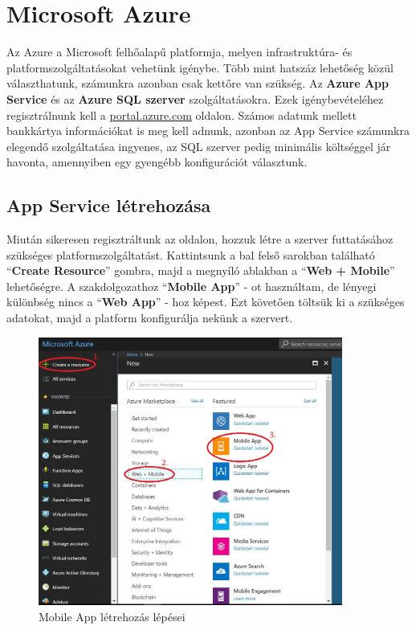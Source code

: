 \documentclass[a4paper,12pt]{report}
\begin{document}
    \section{Microsoft Azure}
    Az Azure a Microsoft felhőalapű platformja, melyen infrastruktúra- és platformszolgáltatásokat vehetünk igénybe. Több mint
    hatszáz lehetőség közül választhatunk, számunkra azonban csak kettőre van szükség. Az \textbf{Azure App Service} és az
    \textbf{Azure SQL szerver} szolgáltatásokra. Ezek igénybevételéhez regisztrálnunk kell a \url{portal.azure.com} oldalon.
    Számos adatunk mellett bankkártya információkat is meg kell adnunk, azonban az App Service számunkra elegendő szolgáltatása
    ingyenes, az SQL szerver pedig minimális költséggel jár havonta, amennyiben egy gyengébb konfigurációt választunk.\cite{AzureDoc}

    \subsection{App Service létrehozása}
    Miután sikeresen regisztráltunk az oldalon, hozzuk létre a szerver futtatásához szükséges platformszolgáltatást. Kattintsunk
    a bal felső sarokban található ``\textbf{Create Resource}'' gombra, majd a megnyíló ablakban a ``\textbf{Web + Mobile}'' lehetőségre.
    A szakdolgozathoz ``\textbf{Mobile App}'' - ot használtam, de lényegi különbség nincs a ``\textbf{Web App}'' - hoz képest.
    Ezt követően töltsük ki a szükséges adatokat, majd a platform konfigurálja nekünk a szervert.

    \begin{figure}[H]
        \centering
        \includegraphics[width=10cm,keepaspectratio]{images/azurecreatemobilapp.jpg}
        \caption{Mobile App létrehozás lépései}
        \label{fig: MobileApp}
    \end{figure}
\end{document}
